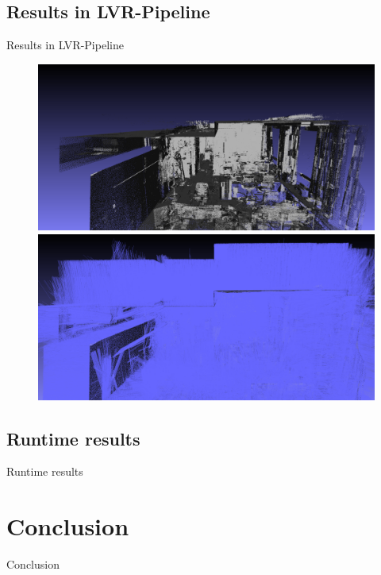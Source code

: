 \documentclass{beamer}
\begin{document}
\subsection*{Results in LVR-Pipeline}
\begin{frame}{Results in LVR-Pipeline}
 \begin{figure}
  \centering
  \includegraphics[height=0.4\textheight]{police_no_normals.png}\\
  \includegraphics[height=0.4\textheight]{police_normals.png}
 \end{figure}

\end{frame}

\subsection*{Runtime results}
\begin{frame}{Runtime results}
 
\end{frame}

\section{Conclusion}
\begin{frame}{Conclusion}
 
\end{frame}
\end{document}
